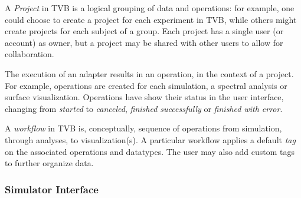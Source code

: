 		A \emph{Project} in TVB is a logical grouping of data and operations: 
        for example, one could choose to
		create a project for each experiment in TVB, while others might
		create projects for each subject of a group. Each project has a single
		user (or account) as owner, but a project may be shared
		with other users to allow for collaboration.

		The execution of an adapter results in an operation, in the
		context of a project. For example, operations are created for each
		simulation, a spectral analysis or surface visualization. 
        Operations have show their status in the user interface, changing from
		\emph{started} to \emph{canceled}, \emph{finished successfully} or
		\emph{finished with error}. 

		A \emph{workflow} in TVB is, conceptually, sequence of operations from simulation,
        through analyses, to visualization(s). A particular workflow applies
		 a default \emph{tag} on the associated operations and
		datatypes.
        The user may also add custom tags to further organize data.

		\subsubsection{Simulator Interface}

